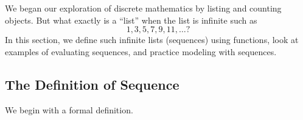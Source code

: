 \section{\secexplicitseq}
\label{sec_explicitly_defined_sequences}

We began our exploration of discrete mathematics by listing and counting objects.  But what exactly is a ``list'' when the list is 
infinite such as 
$$1,3,5,7,9,11,\ldots?$$
In this section, we define such infinite lists (sequences) using functions, look at examples of evaluating sequences, and practice modeling with sequences.  

\newcommand{\subdefnseq}{The Definition of Sequence}
\subsection{\subdefnseq}
\label{sub_defn_seq}

We begin with a formal definition.

